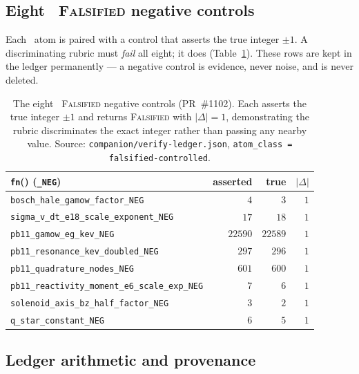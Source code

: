 \subsection{Eight \tierRed\ \textsc{Falsified} negative controls}
\label{app:verify-ledger:red}

Each \tierBlue\ atom is paired with a control that asserts the true
integer $\pm1$. A discriminating rubric must \emph{fail} all eight; it
does (Table~\ref{tab:app:ledger:red}). These rows are kept in the ledger
permanently --- a negative control is evidence, never noise, and is
never deleted.

\begin{table}[h]
\centering
\scriptsize
\setlength{\tabcolsep}{4pt}
\begin{tabular}{@{}lrrr@{}}
\toprule
\texttt{fn}() (\verb|_NEG|) & asserted & true & $|\Delta|$ \\
\midrule
\verb|bosch_hale_gamow_factor_NEG|             & $4$     & $3$     & $1$ \\
\verb|sigma_v_dt_e18_scale_exponent_NEG|       & $17$    & $18$    & $1$ \\
\verb|pb11_gamow_eg_kev_NEG|                   & $22590$ & $22589$ & $1$ \\
\verb|pb11_resonance_kev_doubled_NEG|          & $297$   & $296$   & $1$ \\
\verb|pb11_quadrature_nodes_NEG|               & $601$   & $600$   & $1$ \\
\verb|pb11_reactivity_moment_e6_scale_exp_NEG| & $7$     & $6$     & $1$ \\
\verb|solenoid_axis_bz_half_factor_NEG|        & $3$     & $2$     & $1$ \\
\verb|q_star_constant_NEG|                     & $6$     & $5$     & $1$ \\
\bottomrule
\end{tabular}
\caption{The eight \tierRed\ \textsc{Falsified} negative controls
(PR~\#1102). Each asserts the true integer $\pm1$ and returns
\textsc{Falsified} with $|\Delta|=1$, demonstrating the rubric
discriminates the exact integer rather than passing any nearby value.
Source: \texttt{companion/verify-ledger.json}, \texttt{atom\_class =
falsified-controlled}.}
\label{tab:app:ledger:red}
\end{table}

\subsection{Ledger arithmetic and provenance}
\label{app:verify-ledger:closure}

